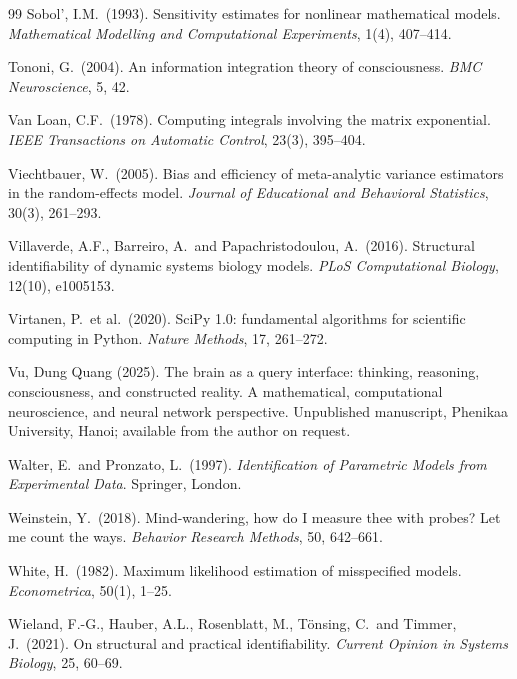 \begin{thebibliography}{99}
Sobol', I.M.\ (1993).
Sensitivity estimates for nonlinear mathematical models.
\textit{Mathematical Modelling and Computational Experiments}, 1(4), 407--414.

Tononi, G.\ (2004).
An information integration theory of consciousness.
\textit{BMC Neuroscience}, 5, 42.

Van Loan, C.F.\ (1978).
Computing integrals involving the matrix exponential.
\textit{IEEE Transactions on Automatic Control}, 23(3), 395--404.

Viechtbauer, W.\ (2005).
Bias and efficiency of meta-analytic variance estimators in the random-effects model.
\textit{Journal of Educational and Behavioral Statistics}, 30(3), 261--293.

Villaverde, A.F., Barreiro, A.\ and Papachristodoulou, A.\ (2016).
Structural identifiability of dynamic systems biology models.
\textit{PLoS Computational Biology}, 12(10), e1005153.

Virtanen, P.\ et al.\ (2020).
SciPy 1.0: fundamental algorithms for scientific computing in Python.
\textit{Nature Methods}, 17, 261--272.

{\color{red}Vu, Dung Quang (2025).
The brain as a query interface: thinking, reasoning, consciousness, and constructed reality. A mathematical, computational neuroscience, and neural network perspective.
Unpublished manuscript, Phenikaa University, Hanoi; available from the author on request.} %

Walter, E.\ and Pronzato, L.\ (1997).
\textit{Identification of Parametric Models from Experimental Data}. Springer, London.

Weinstein, Y.\ (2018).
Mind-wandering, how do I measure thee with probes? Let me count the ways.
\textit{Behavior Research Methods}, 50, 642--661.

White, H.\ (1982).
Maximum likelihood estimation of misspecified models.
\textit{Econometrica}, 50(1), 1--25.

Wieland, F.-G., Hauber, A.L., Rosenblatt, M., T\"onsing, C.\ and Timmer, J.\ (2021).
On structural and practical identifiability.
\textit{Current Opinion in Systems Biology}, 25, 60--69.

\end{thebibliography}


